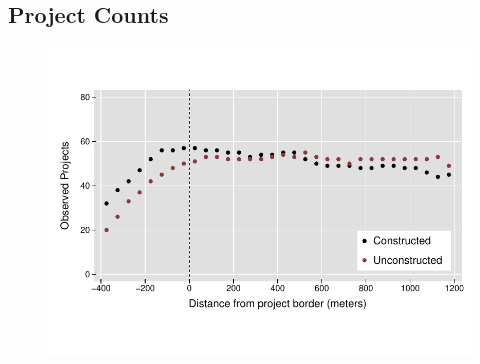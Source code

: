\documentclass[12pt]{article}
\begin{document}
\pagebreak
\subsection{Project Counts}
\label{appendix:projectcounts}
\vspace{-5mm}
\begin{figure}[h!]
\centering
\includegraphics[scale=1.2,trim={.2cm 1.2cm .2cm 1.2cm},clip]{figures/projectcounts.pdf}
\end{figure}
\end{document}
